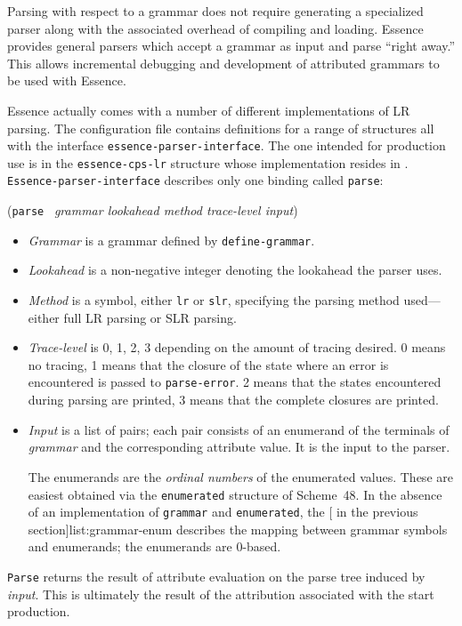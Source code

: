 \documentclass{article}
\renewcommand{\var}[1]{\noindent\mbox{\textit{#1}}}
\newcommand{\ide}[1]{{\frenchspacing\textnormal{\texttt{#1}}}}
\newcommand{\pproto}[2]{\unskip%
\mbox{\texonly{\spaceskip=0.5em}#1}%
\mbox{ }\texonly{\nobreak}\htmlonly{ }\textrm{#2}}
\newcommand{\proto}[3]{\par\bigskip\begin{flushleft}\pproto{(\texttt{#1}}{\textit{#2})}\hspace*{\fill}{#3}\end{flushleft}}
\newcommand{\codefont}[1]{\texttt{#1}}
\begin{document}
Parsing with respect to a grammar does not require generating a
specialized parser along with the associated overhead of compiling and
loading.  Essence provides general parsers which accept a grammar as
input and parse ``right away.''  This allows incremental debugging and 
development of attributed grammars to be used with Essence.

Essence actually comes with a number of different implementations of
LR parsing.  The  configuration file contains
definitions for a range of structures all with the interface
\codefont{essence-parser-interface}.  The one intended for production use is in the
\codefont{essence-cps-lr} structure whose implementation resides in
.  \codefont{Essence-parser-interface} describes only 
one binding called \codefont{parse}:

\label{proc:parse}
\proto{parse}{grammar lookahead method trace-level input}{procedure}
%
\begin{itemize}
\item \var{Grammar} is a grammar defined by \codefont{define-grammar}.
\item \var{Lookahead} is a non-negative integer denoting the
  lookahead the parser uses.
\item \var{Method} is a symbol, either \codefont{lr} or
  \codefont{slr}, specifying the parsing method used---either full LR
  parsing or SLR parsing.
\item \var{Trace-level} is 0, 1, 2, 3 depending on the amount of
  tracing desired.  0 means no tracing, 1 means that the closure of
  the state where an error is encountered is passed to
  \ide{parse-error}.  2 means that the states encountered during
  parsing are printed, 3 means that the complete closures are printed.
\item \var{Input} is a list of pairs; each pair consists of an enumerand of the
  terminals of \var{grammar} and the corresponding attribute value.  It is the
  input to the parser. 
  
  The enumerands are the \emph{ordinal numbers} of the enumerated
  values.  These are easiest obtained via the \codefont{enumerated} structure
  of Scheme~48.  In the absence of an implementation of \codefont{grammar} and
  \codefont{enumerated}, the [ in the previous
  section]{list:grammar-enum} describes the mapping between grammar symbols and
  enumerands; the enumerands are 0-based.
\end{itemize}
%
\ide{Parse} returns the result of attribute evaluation on the parse
tree induced by \var{input}.  This is ultimately the result of the
attribution associated with the start production.
\end{document}
